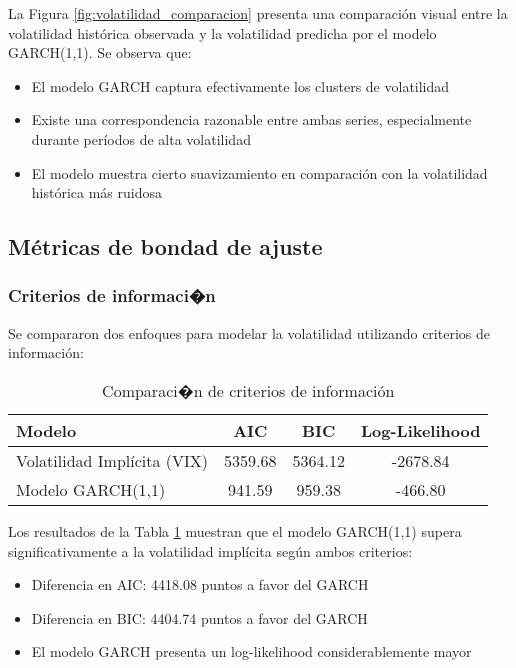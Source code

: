 La Figura \ref{fig:volatilidad_comparacion} presenta una comparación visual entre la volatilidad histórica observada y la volatilidad predicha por el modelo GARCH(1,1). Se observa que:

\begin{itemize}
    \item El modelo GARCH captura efectivamente los clusters de volatilidad
    \item Existe una correspondencia razonable entre ambas series, especialmente durante períodos de alta volatilidad
    \item El modelo muestra cierto suavizamiento en comparación con la volatilidad histórica más ruidosa
\end{itemize}

\subsection{Métricas de bondad de ajuste}

\subsubsection{Criterios de informaci�n}

Se compararon dos enfoques para modelar la volatilidad utilizando criterios de información:

\begin{table}[hbt!]
\centering
\caption{Comparaci�n de criterios de información}
\begin{tabular}{lccc}
\hline
\textbf{Modelo} & \textbf{AIC} & \textbf{BIC} & \textbf{Log-Likelihood} \\
\hline
Volatilidad Implícita (VIX) & 5359.68 & 5364.12 & -2678.84 \\
Modelo GARCH(1,1) & 941.59 & 959.38 & -466.80 \\
\hline
\end{tabular}
\label{tab:criterios_info}
\end{table}

Los resultados de la Tabla \ref{tab:criterios_info} muestran que el modelo GARCH(1,1) supera significativamente a la volatilidad implícita según ambos criterios:
\begin{itemize}
    \item Diferencia en AIC: 4418.08 puntos a favor del GARCH
    \item Diferencia en BIC: 4404.74 puntos a favor del GARCH
    \item El modelo GARCH presenta un log-likelihood considerablemente mayor
\end{itemize}

